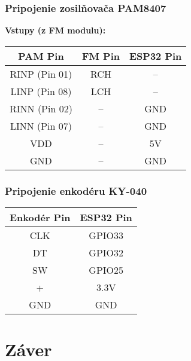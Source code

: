 \documentclass[11pt, a4paper]{article}
\begin{document}
\subsubsection{Pripojenie zosilňovača PAM8407}

\textbf{Vstupy (z FM modulu):}

\begin{tabular}{|c|c|c|}
\hline
\textbf{PAM Pin}    & \textbf{FM Pin} & \textbf{ESP32 Pin} \\
\hline
RINP (Pin 01)       & RCH                          & -- \\
LINP (Pin 08)       & LCH                          & -- \\
RINN (Pin 02)       & --                          & GND \\
LINN (Pin 07)       & --                          & GND \\
VDD                 & --                            & 5V \\
GND                 & --                            & GND \\
\hline
\end{tabular}
    

\subsubsection{Pripojenie enkodéru KY-040}

\begin{tabular}{|c|c|}
\hline
\textbf{Enkodér Pin} & \textbf{ESP32 Pin} \\
\hline
CLK & GPIO33 \\
DT  & GPIO32 \\
SW  & GPIO25 \\
+   & 3.3V \\
GND & GND \\
\hline
\end{tabular}

\section{Záver}
\end{document}
